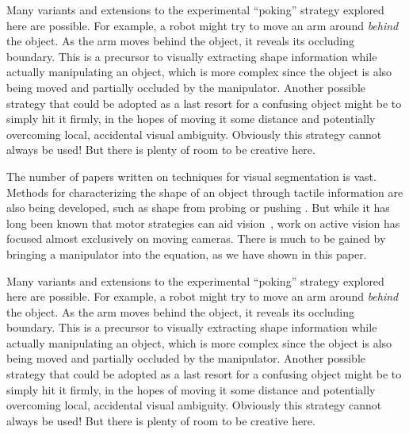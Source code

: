 
\ifverbose
Many variants and extensions to the
experimental ``poking'' strategy explored here are possible.  For
example, a robot might try to move an arm around {\em behind} the
object.  As the arm moves behind the object, it reveals its occluding
boundary.  This is a precursor to visually extracting shape
information while actually manipulating an object, which is more
complex since the object is also being moved and partially occluded by
the manipulator.  Another possible strategy that could be adopted as a
last resort for a confusing object might be to simply hit it firmly,
in the hopes of moving it some distance and potentially overcoming
local, accidental visual ambiguity.  Obviously this strategy cannot
always be used!  But there is plenty of room to be creative here.
\fi



\ifverbose
The number of papers written on techniques for visual segmentation is
vast.  Methods for characterizing the shape of an object through
tactile information are also being developed, such as shape from
probing 
\cite{paulos99fast} 
or pushing
\cite{moll01reconstructing}.
But while it has long
been known that motor strategies can aid
vision~\cite{ballard91animate}, work on active vision has focused
almost exclusively on moving cameras.  There is much to be gained by
bringing a manipulator into the equation, as we have shown in this
paper.  

Many variants and extensions to the experimental ``poking''
strategy explored here are possible.  For example, a robot might try
to move an arm around {\em behind} the object.  As the arm moves
behind the object, it reveals its occluding boundary.  This is a
precursor to visually extracting shape information while actually
manipulating an object, which is more complex since the object is also
being moved and partially occluded by the manipulator.  Another
possible strategy that could be adopted as a last resort for a
confusing object might be to simply hit it firmly, in the hopes of
moving it some distance and potentially overcoming local, accidental
visual ambiguity.  Obviously this strategy cannot always be used!  But
there is plenty of room to be creative here.
\fi


